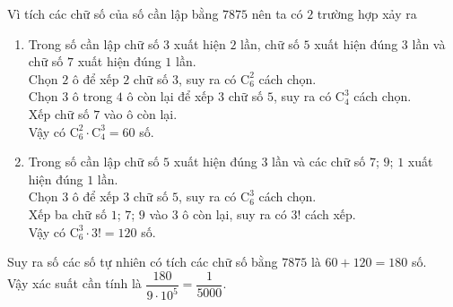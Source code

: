 \begin{vd}
{		Vì tích các chữ số của số cần lập bằng $7875$ nên ta có $2$ trường hợp xảy ra 
		\begin{enumerate}[TH.1]
			\item Trong số cần lập chữ số $3$ xuất hiện $2$ lần, chữ số $5$ xuất hiện đúng $3$ lần và chữ số $7$ xuất hiện đúng $1$ lần.\\
			Chọn $2$ ô để xếp $2$ chữ số $3$,  suy ra có $\mathrm{C}^2_6$ cách chọn.\\
			Chọn $3$ ô trong $4$ ô còn lại để xếp $3$ chữ số $5$, suy ra có $\mathrm{C}^3_4$ cách chọn.\\
			Xếp chữ số $7$ vào ô còn lại.\\
			Vậy có $\mathrm{C}^2_6 \cdot \mathrm{C}^3_4=60$ số.
			\item Trong số cần lập chữ số $5$ xuất hiện đúng $3$ lần và các chữ số $7$; $9$; $1$ xuất hiện đúng $1$ lần.\\
			Chọn $3$ ô để xếp $3$ chữ số $5$, suy ra có $\mathrm{C}^3_6$ cách chọn.\\
			Xếp ba chữ số $1$; $7$; $9$ vào $3$ ô còn lại, suy ra có $3!$ cách xếp.\\
			Vậy có $\mathrm{C}^3_6 \cdot 3! = 120$ số.
		\end{enumerate}
		Suy ra số các số tự nhiên có tích các chữ số bằng $7875$ là $60+120=180$ số.\\
		Vậy xác suất cần tính là $\dfrac{180}{9 \cdot 10^5} = \dfrac{1}{5000}$.
	}
\end{vd}
